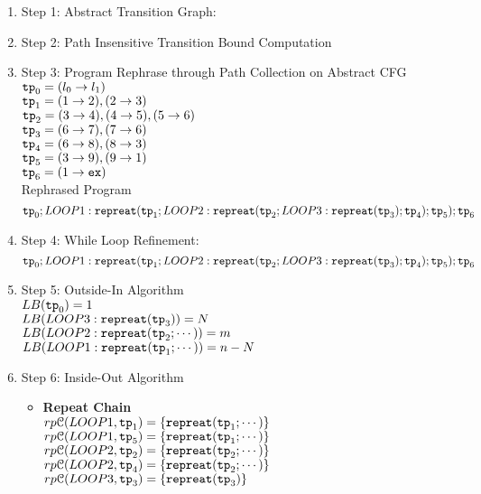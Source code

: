 \begin{enumerate}
    \item Step 1: Abstract Transition Graph:

\item Step 2: Path Insensitive Transition Bound Computation

\item Step 3: Program Rephrase through Path Collection on Abstract CFG
\\
$\mathtt{tp}_0 = (l_0 \to l_1)$
\\
$\mathtt{tp}_1 = (1 \to 2),  (2 \to 3)$
\\
$\mathtt{tp}_2 = (3 \to 4), (4 \to 5), (5 \to 6)$
\\
$\mathtt{tp}_3 = (6 \to 7), (7 \to 6)$
\\
$\mathtt{tp}_4 = (6 \to 8), (8 \to 3)$
\\
$\mathtt{tp}_5 = (3 \to 9), (9 \to 1)$
\\
$\mathtt{tp}_6 = (1 \to \mathtt{ex})$
\\
Rephrased Program
\[
\mathtt{tp}_0 ; LOOP1: \mathtt{repreat}(\mathtt{tp}_1; LOOP2: \mathtt{repreat}(\mathtt{tp}_2; LOOP3 : \mathtt{repreat}(\mathtt{tp}_3); \mathtt{tp}_4); \mathtt{tp}_5); \mathtt{tp}_6
\]
\item Step 4: While Loop Refinement:
\[
\mathtt{tp}_0 ; LOOP1: \mathtt{repreat}(\mathtt{tp}_1; LOOP2: \mathtt{repreat}(\mathtt{tp}_2; LOOP3 : \mathtt{repreat}(\mathtt{tp}_3); \mathtt{tp}_4); \mathtt{tp}_5); \mathtt{tp}_6
\]
\item Step 5: Outside-In Algorithm
\\
$LB(\mathtt{tp}_0) = 1$
\\
$LB(LOOP3 : \mathtt{repreat}(\mathtt{tp}_3)) = N $
\\
$LB(LOOP2: \mathtt{repreat}(\mathtt{tp}_2; \cdots)) = m $
\\
$LB(LOOP1: \mathtt{repreat}(\mathtt{tp}_1; \cdots)) = n - N $
\\
\item Step 6: Inside-Out Algorithm
\begin{itemize}
    \item \textbf{Repeat Chain}
    \\
    $rp\mathcal{C}(LOOP1, \mathtt{tp}_1) = \{\mathtt{repreat}(\mathtt{tp}_1; \cdots)\}$ \\
    $rp\mathcal{C}(LOOP1, \mathtt{tp}_5) = \{\mathtt{repreat}(\mathtt{tp}_1; \cdots)\}$ \\
    $rp\mathcal{C}(LOOP2, \mathtt{tp}_2) = \{\mathtt{repreat}(\mathtt{tp}_2; \cdots)\}$ \\
    $rp\mathcal{C}(LOOP2, \mathtt{tp}_4) = \{\mathtt{repreat}(\mathtt{tp}_2; \cdots)\}$ \\
    $rp\mathcal{C}(LOOP3, \mathtt{tp}_3) = \{\mathtt{repreat}(\mathtt{tp}_3)\}$ \\

\end{itemize}
\end{enumerate}
